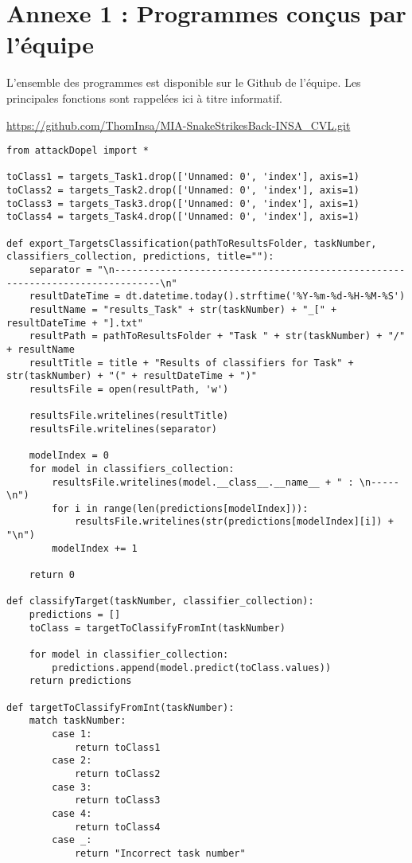 \chapter*{Annexe 1 : Programmes conçus par l'équipe}

L'ensemble des programmes est disponible sur le Github de l'équipe. Les principales fonctions
sont rappelées ici à titre informatif.
\begin{center}
    \url{https://github.com/ThomInsa/MIA-SnakeStrikesBack-INSA_CVL.git}
\end{center}

\begin{lstlisting}[caption={Fonctions permettant de classifier les fichiers \texttt{targetsTask}}]
from attackDopel import *

toClass1 = targets_Task1.drop(['Unnamed: 0', 'index'], axis=1)
toClass2 = targets_Task2.drop(['Unnamed: 0', 'index'], axis=1)
toClass3 = targets_Task3.drop(['Unnamed: 0', 'index'], axis=1)
toClass4 = targets_Task4.drop(['Unnamed: 0', 'index'], axis=1)

def export_TargetsClassification(pathToResultsFolder, taskNumber, classifiers_collection, predictions, title=""):
    separator = "\n------------------------------------------------------------------------------\n"
    resultDateTime = dt.datetime.today().strftime('%Y-%m-%d-%H-%M-%S')
    resultName = "results_Task" + str(taskNumber) + "_[" + resultDateTime + "].txt"
    resultPath = pathToResultsFolder + "Task " + str(taskNumber) + "/" + resultName
    resultTitle = title + "Results of classifiers for Task" + str(taskNumber) + "(" + resultDateTime + ")"
    resultsFile = open(resultPath, 'w')

    resultsFile.writelines(resultTitle)
    resultsFile.writelines(separator)

    modelIndex = 0
    for model in classifiers_collection:
        resultsFile.writelines(model.__class__.__name__ + " : \n-----\n")
        for i in range(len(predictions[modelIndex])):
            resultsFile.writelines(str(predictions[modelIndex][i]) + "\n")
        modelIndex += 1

    return 0

def classifyTarget(taskNumber, classifier_collection):
    predictions = []
    toClass = targetToClassifyFromInt(taskNumber)

    for model in classifier_collection:
        predictions.append(model.predict(toClass.values))
    return predictions

def targetToClassifyFromInt(taskNumber):
    match taskNumber:
        case 1:
            return toClass1
        case 2:
            return toClass2
        case 3:
            return toClass3
        case 4:
            return toClass4
        case _:
            return "Incorrect task number"
\end{lstlisting}

